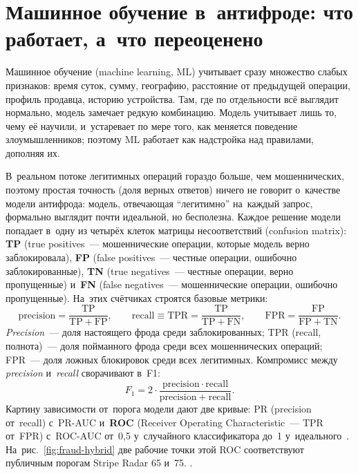 \section{Машинное обучение в~антифроде: что работает, а~что переоценено}\label{sec:fraud-ml}

Машинное обучение (machine learning, ML) учитывает сразу множество
слабых признаков: время
суток, сумму, географию, расстояние от предыдущей операции, профиль
продавца, историю устройства. Там, где по отдельности всё выглядит
нормально, модель замечает редкую комбинацию. Модель учитывает лишь то,
чему её научили, и~устаревает по мере того, как меняется поведение злоумышленников;
поэтому ML работает как надстройка над правилами, дополняя их.

В~реальном потоке легитимных операций гораздо больше, чем
мошеннических, поэтому простая точность (доля верных ответов)
ничего не говорит о~качестве модели антифрода: модель, отвечающая
\enquote{легитимно} на~каждый запрос, формально выглядит почти
идеальной, но бесполезна. Каждое решение модели попадает в~одну
из четырёх клеток матрицы несоответствий (confusion matrix):
\textbf{TP} (true positives~--- мошеннические операции, которые
модель верно заблокировала), \textbf{FP} (false positives~---
честные операции, ошибочно заблокированные), \textbf{TN} (true
negatives~--- честные операции, верно пропущенные) и~\textbf{FN}
(false negatives~--- мошеннические операции, ошибочно пропущенные).
На~этих счётчиках строятся базовые метрики:
\[
  \mathrm{precision} = \frac{\mathrm{TP}}{\mathrm{TP} + \mathrm{FP}},
  \qquad
  \mathrm{recall} \equiv \mathrm{TPR} = \frac{\mathrm{TP}}{\mathrm{TP} + \mathrm{FN}},
  \qquad
  \mathrm{FPR} = \frac{\mathrm{FP}}{\mathrm{FP} + \mathrm{TN}}.
\]
\textit{Precision}~--- доля настоящего фрода среди заблокированных;
TPR (recall, полнота)~--- доля пойманного фрода среди всех мошеннических
операций; FPR~--- доля ложных блокировок среди всех легитимных. Компромисс
между \textit{precision} и~\textit{recall} сворачивают в~F1:
\[
  F_1 = 2 \cdot \frac{\mathrm{precision} \cdot \mathrm{recall}}
                     {\mathrm{precision} + \mathrm{recall}}.
\]
Картину зависимости от~порога модели дают две кривые: PR (precision
от~recall) с~PR-AUC и~\textbf{ROC} (Receiver Operating
Characteristic~--- TPR от~FPR) с~ROC-AUC от~0,5 у~случайного
классификатора до~1 у~идеального~\cite{sklearn-classification-metrics,roc-pr-imbalanced-2024}.
На~рис.~\ref{fig:fraud-hybrid} две рабочие точки этой ROC соответствуют
публичным порогам Stripe Radar 65 и~75. .

